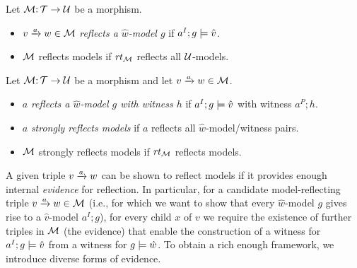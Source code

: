 \begin{definition}
Let ${\mathcal{M}}{:}\, {\mathcal{T}}\rightarrow{\mathcal{U}}$ be a morphism.
\begin{itemize}[topsep=\itemsep]
\item $\trip vaw\in\cM$ \emph{reflects a $\hat w$-model $g$} if $a^I;g\models \hat v$.

\item ${\mathcal{M}}$ reflects models if $\mathit{rt}_{{\mathcal{M}}}$ reflects all ${\mathcal{U}}$-models.
\end{itemize}
\end{definition}
%
\begin{definition}
Let ${\mathcal{M}}{:}\, {\mathcal{T}}\rightarrow{\mathcal{U}}$ be a morphism and let $\trip vaw\in\cM$.
\begin{itemize}[topsep=\itemsep]
\item $a$ \emph{reflects a $\hat w$-model $g$ with witness $h$} if $a^I;g\models \hat v$ with witness $a^P;h$.
	
\item $a$ \emph{strongly reflects models} if $a$ reflects all $\hat w$-model/witness pairs.
		
\item ${\mathcal{M}}$ strongly reflects models if $\mathit{rt}_{{\mathcal{M}}}$ reflects models.
\end{itemize}
\end{definition}
%
%
A given triple $\trip vaw$ can be shown to reflect models if it provides enough internal \emph{evidence} for reflection. In particular, for a candidate model-reflecting triple $\trip vaw\in \cM$ (i.e., for which we want to show that every $\hat w$-model $g$ gives rise to a $\hat v$-model $a^I;g$), for every child $x$ of $v$ we require the existence of further triples in ${\mathcal{M}}$ (the evidence) that enable the construction of a witness for $a^I;g\models \hat v$ from a witness for $g\models \hat w$. To obtain a rich enough framework, we introduce diverse forms of evidence.

